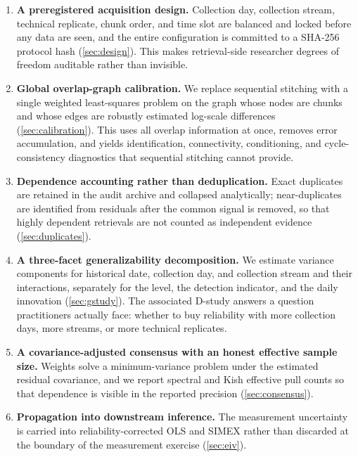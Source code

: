 \documentclass[12pt,a4paper,oneside]{article}
\begin{document}
\begin{enumerate}
\item \textbf{A preregistered acquisition design.} Collection day, collection
stream, technical replicate, chunk order, and time slot are balanced and locked
before any data are seen, and the entire configuration is committed to a
SHA-256 protocol hash (\cref{sec:design}). This makes retrieval-side
researcher degrees of freedom auditable rather than invisible.

\item \textbf{Global overlap-graph calibration.} We replace sequential stitching
with a single weighted least-squares problem on the graph whose nodes are chunks
and whose edges are robustly estimated log-scale differences
(\cref{sec:calibration}). This uses all overlap information at once, removes
error accumulation, and yields identification, connectivity, conditioning, and
cycle-consistency diagnostics that sequential stitching cannot provide.

\item \textbf{Dependence accounting rather than deduplication.} Exact duplicates
are retained in the audit archive and collapsed analytically; near-duplicates are
identified from residuals after the common signal is removed, so that highly
dependent retrievals are not counted as independent evidence
(\cref{sec:duplicates}).

\item \textbf{A three-facet generalizability decomposition.} We estimate variance
components for historical date, collection day, and collection stream and their
interactions, separately for the level, the detection indicator, and the daily
innovation (\cref{sec:gstudy}). The associated D-study answers a question
practitioners actually face: whether to buy reliability with more collection
days, more streams, or more technical replicates.

\item \textbf{A covariance-adjusted consensus with an honest effective sample
size.} Weights solve a minimum-variance problem under the estimated residual
covariance, and we report spectral and Kish effective pull counts so that
dependence is visible in the reported precision (\cref{sec:consensus}).

\item \textbf{Propagation into downstream inference.} The measurement
uncertainty is carried into reliability-corrected OLS and SIMEX rather than
discarded at the boundary of the measurement exercise (\cref{sec:eiv}).
\end{enumerate}
\end{document}
